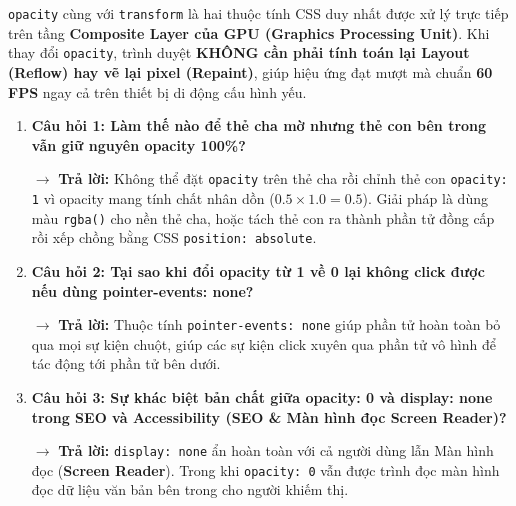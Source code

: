 \documentclass[11pt,oneside]{book}
\newcommand{\codeinline}[1]{\textcolor{accentOrange}{\texttt{#1}}}
\newcommand{\term}[1]{\textbf{\textcolor{primaryBlue}{#1}}}
\begin{document}
\begin{tipBox}
\codeinline{opacity} cùng với \codeinline{transform} là hai thuộc tính CSS duy nhất được xử lý trực tiếp trên tầng \textbf{Composite Layer của GPU (Graphics Processing Unit)}. Khi thay đổi \codeinline{opacity}, trình duyệt \textbf{KHÔNG cần phải tính toán lại Layout (Reflow) hay vẽ lại pixel (Repaint)}, giúp hiệu ứng đạt mượt mà chuẩn \textbf{60 FPS} ngay cả trên thiết bị di động cấu hình yếu.
\end{tipBox}

\begin{warnBox}
\begin{enumerate}[leftmargin=1.5em, itemsep=5pt, parsep=0pt]
    \item \textbf{Câu hỏi 1: Làm thế nào để thẻ cha mờ nhưng thẻ con bên trong vẫn giữ nguyên opacity 100\%?} \par
    $\rightarrow$ \textbf{Trả lời:} Không thể đặt \codeinline{opacity} trên thẻ cha rồi chỉnh thẻ con \codeinline{opacity: 1} vì opacity mang tính chất nhân dồn ($0.5 \times 1.0 = 0.5$). Giải pháp là dùng màu \codeinline{rgba()} cho nền thẻ cha, hoặc tách thẻ con ra thành phần tử đồng cấp rồi xếp chồng bằng CSS \codeinline{position: absolute}.

    \item \textbf{Câu hỏi 2: Tại sao khi đổi opacity từ 1 về 0 lại không click được nếu dùng pointer-events: none?} \par
    $\rightarrow$ \textbf{Trả lời:} Thuộc tính \codeinline{pointer-events: none} giúp phần tử hoàn toàn bỏ qua mọi sự kiện chuột, giúp các sự kiện click xuyên qua phần tử vô hình để tác động tới phần tử bên dưới.

    \item \textbf{Câu hỏi 3: Sự khác biệt bản chất giữa opacity: 0 và display: none trong SEO và Accessibility (SEO \& Màn hình đọc Screen Reader)?} \par
    $\rightarrow$ \textbf{Trả lời:} \codeinline{display: none} ẩn hoàn toàn với cả người dùng lẫn Màn hình đọc (\term{Screen Reader}). Trong khi \codeinline{opacity: 0} vẫn được trình đọc màn hình đọc dữ liệu văn bản bên trong cho người khiếm thị.
\end{enumerate}
\end{warnBox}




\end{document}

